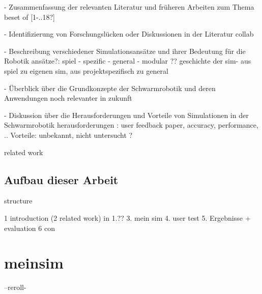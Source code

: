 \documentclass[german,version-2020-11]{uzl-thesis}
\begin{document}
- Zusammenfassung der relevanten Literatur und früheren Arbeiten zum Thema
beset of [1-..18?]


- Identifizierung von Forschungslücken oder Diskussionen in der Literatur   
collab


- Beschreibung verschiedener Simulationsansätze und ihrer Bedeutung für die Robotik
    ansätze?: spiel - spezific - general - modular ??
    geschichte der sim- aus spiel zu eigenen sim, aus projektspezifisch zu general


- Überblick über die Grundkonzepte der Schwarmrobotik und deren Anwendungen
    noch relevanter in zukunft


- Diskussion über die Herausforderungen und Vorteile von Simulationen in der Schwarmrobotik
    herausforderungen : user feedback paper, accuracy, performance, ..
    Vorteile: unbekannt, nicht untersucht ?


related work

\section{Aufbau dieser Arbeit}


%

structure 

1 introduction
(2 related work) in 1.??
3. mein sim
4. user test
5. Ergebnisse + evaluation
6 con









%

\chapter{meinsim}%
\label{chapter-use}



   
   --reroll-
   
\end{document}
